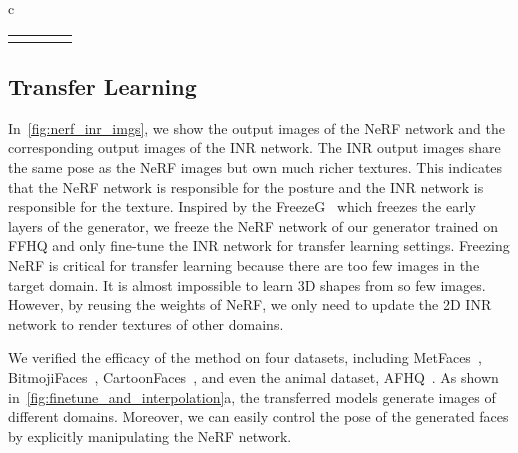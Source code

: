 \documentclass[10pt,twocolumn,letterpaper]{article}
\begin{document}
\begin{figure*}[!t]
{\begin{tabular}{c}
{\begin{tabular}{c|cccccccc}
          \\
          \resizebox{!}{2.0cm}{(b) Stylization (multi-views)}                                                        & \resizebox{!}{1.5cm}{Content} & \multicolumn{6}{c}{\resizebox{!}{2.2cm}{(c) Images synthesized by interpolated models (linear interpolation).}} & \resizebox{!}{1.5cm}{Style}
        \end{tabular}
      }
    \end{tabular}
  }
  \vspace{-0.3cm}
  \caption{(a): Fine-tuning the base model trained on FFHQ to generate images in other domains (please refer to~\cref{sec:finetune} for details). (b) and (c): Interpolating the base model and the transferred model to generate stylized images (please refer to~\cref{sec:interpolation} for details). CIPS-3D enables us to manipulate the pose of the generated faces explicitly. }
  \label{fig:finetune_and_interpolation}
  \vspace{-0.5cm}
\end{figure*}



\subsection{Transfer Learning}
\label{sec:finetune}

In~\cref{fig:nerf_inr_imgs}, we show the output images of the NeRF network and the corresponding output images of the INR network. The INR output images share the same pose as the NeRF images but own much richer textures. This indicates that the NeRF network is responsible for the posture and the INR network is responsible for the texture. Inspired by the FreezeG~\cite{FreezeG} which freezes the early layers of the generator, we freeze the NeRF network of our generator trained on FFHQ and only fine-tune the INR network for transfer learning settings. Freezing NeRF is critical for transfer learning because there are too few images in the target domain. It is almost impossible to learn 3D shapes from so few images. However, by reusing the weights of NeRF, we only need to update the 2D INR network to render textures of other domains.

We verified the efficacy of the method on four datasets, including MetFaces~\cite{karras2020Training}, BitmojiFaces~\cite{BitmojiFaces}, CartoonFaces~\cite{CartoonFaces}, and even the animal dataset, AFHQ~\cite{choi2020StarGAN}. As shown in~\cref{fig:finetune_and_interpolation}a, the transferred models generate images of different domains. Moreover, we can easily control the pose of the generated faces by explicitly manipulating the NeRF network.
\end{document}
